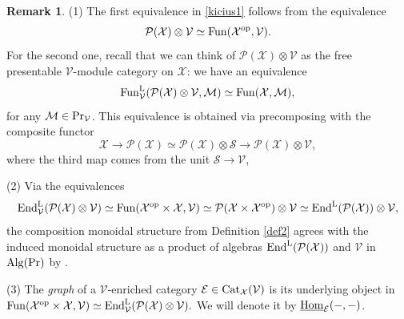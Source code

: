 \documentclass[10pt]{amsart}
\theoremstyle{definition}
\newtheorem{remark}[equation]{Remark}
\theoremstyle{remark}
\newcommand{\uHom}{\underline{{\rm{Hom}} }}
\newcommand{\LL}{\operatorname{L} }
\newcommand{\sv}{{\mathcal{V}}}
\newcommand{\se}{{\mathcal{E}}}
\newcommand{\sx}{{\mathcal{X}}}
\newcommand{\sss}{{\mathcal{S}}}
\newcommand{\sm}{{\mathcal{M}}}
\newcommand{\spp}{{\mathcal{P}}}
\numberwithin{equation}{section}
\numberwithin{equation}{section}
\begin{document}
\begin{remark} (1) The first equivalence in \eqref{kicius1} follows from the equivalence
$$
\spp(\sx) \otimes \sv\simeq {\rm Fun}(\sx^{\rm op}, \sv).
$$
For the second one,  recall that 
  we can think of 
$\spp(\sx) \otimes \sv$ as the free presentable $\sv$-module category on $\sx$: we have  an equivalence
$$ {\rm Fun}^{\LL}_{\sv}(\spp(\sx) \otimes \sv, \sm) \simeq {\rm Fun}(\sx, \sm),$$
for any   $\sm\in {\rm Pr}_{\sv}$.
This equivalence is obtained  via 
 precomposing with
the composite functor
$$\sx \to \spp(\sx) \simeq \spp(\sx) \otimes \sss \to \spp(\sx) \otimes \sv,$$
where the third map comes from the unit   $\sss\to  \sv$,

   (2) Via the equivalences
$${\rm End}^{\LL}_{\sv}(\spp(\sx) \otimes  \sv)\simeq  {\rm Fun}(\sx^{\rm op} \times  \sx, \sv) \simeq  \spp(\sx \times \sx^{\rm op}) \otimes  \sv\simeq  {\rm End}^{\LL}(\spp(\sx)) \otimes  \sv,
$$
the composition monoidal structure from Definition \eqref{def2}  agrees with the induced monoidal
structure as a product of algebras ${\rm End}^{\LL}(\spp(\sx)) $ and $\sv$ in ${\rm Alg}({\rm Pr}) $ by \cite[Prop. 3.10]{BMS24}.

 (3)  The {\em graph}  of a  $\sv$-enriched category $\se \in {\rm Cat}_{\sx}(\sv) $ is its underlying
object in  ${\rm Fun}(\sx^{\rm op}\times\sx, \sv) \simeq {\rm End}^{\LL}_{\sv}(\spp(\sx) \otimes  \sv).$ We will denote it by $\uHom_{\se}(-,-)$. 

\end{remark}
\end{document}
